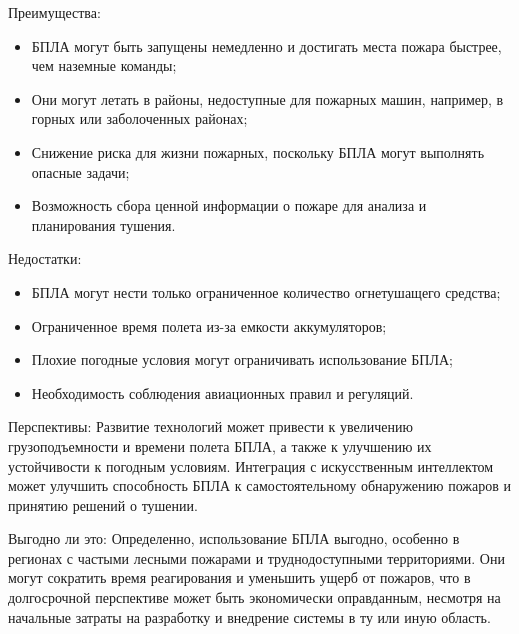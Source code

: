 Преимущества:
\begin{itemize}
	\item БПЛА могут быть запущены немедленно и достигать места пожара быстрее, чем наземные команды;
	\item Они могут летать в районы, недоступные для пожарных машин, например, в горных или заболоченных районах;
	\item Снижение риска для жизни пожарных, поскольку БПЛА могут выполнять опасные задачи;
	\item Возможность сбора ценной информации о пожаре для анализа и планирования тушения.
\end{itemize}
Недостатки:
\begin{itemize}
	\item БПЛА могут нести только ограниченное количество огнетушащего средства;
	\item Ограниченное время полета из-за емкости аккумуляторов;
	\item Плохие погодные условия могут ограничивать использование БПЛА;
	\item Необходимость соблюдения авиационных правил и регуляций.
\end{itemize}

Перспективы:
Развитие технологий может привести к увеличению грузоподъемности и времени полета БПЛА, а также к улучшению их устойчивости к погодным условиям. Интеграция с искусственным интеллектом может улучшить способность БПЛА к самостоятельному обнаружению пожаров и принятию решений о тушении.

Выгодно ли это:
Определенно, использование БПЛА выгодно, особенно в регионах с частыми лесными пожарами и труднодоступными территориями. Они могут сократить время реагирования и уменьшить ущерб от пожаров, что в долгосрочной перспективе может быть экономически оправданным, несмотря на начальные затраты на разработку и внедрение системы в ту или иную область.
